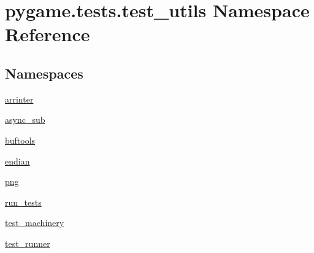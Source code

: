 \hypertarget{namespacepygame_1_1tests_1_1test__utils}{}\section{pygame.\+tests.\+test\+\_\+utils Namespace Reference}
\label{namespacepygame_1_1tests_1_1test__utils}
\subsection*{Namespaces}
\begin{DoxyCompactItemize}
\item 
 \hyperlink{namespacepygame_1_1tests_1_1test__utils_1_1arrinter}{arrinter}
\item 
 \hyperlink{namespacepygame_1_1tests_1_1test__utils_1_1async__sub}{async\+\_\+sub}
\item 
 \hyperlink{namespacepygame_1_1tests_1_1test__utils_1_1buftools}{buftools}
\item 
 \hyperlink{namespacepygame_1_1tests_1_1test__utils_1_1endian}{endian}
\item 
 \hyperlink{namespacepygame_1_1tests_1_1test__utils_1_1png}{png}
\item 
 \hyperlink{namespacepygame_1_1tests_1_1test__utils_1_1run__tests}{run\+\_\+tests}
\item 
 \hyperlink{namespacepygame_1_1tests_1_1test__utils_1_1test__machinery}{test\+\_\+machinery}
\item 
 \hyperlink{namespacepygame_1_1tests_1_1test__utils_1_1test__runner}{test\+\_\+runner}
\end{DoxyCompactItemize}
